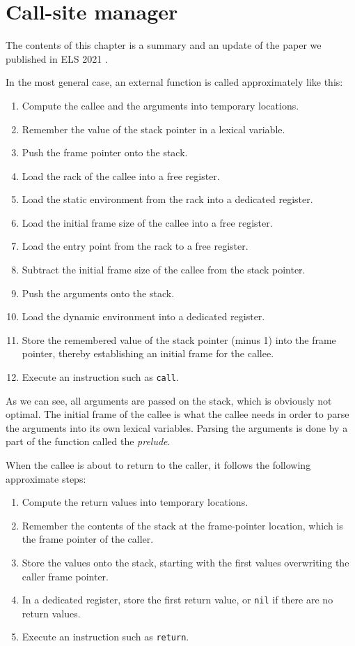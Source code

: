\chapter{Call-site manager}
\label{chap-call-site-manager}

The contents of this chapter is a summary and an update of the paper
we published in ELS 2021 \cite{DBLP:conf/els/Strandh21}.

In the most general case, an external function is called approximately
like this:
\begin{enumerate}
\item Compute the callee and the arguments into temporary locations.
\item Remember the value of the stack pointer in a lexical variable.
\item Push the frame pointer onto the stack.
\item Load the rack of the callee into a free register.
\item Load the static environment from the rack into a dedicated
  register.
\item Load the initial frame size of the callee into a free register.
\item Load the entry point from the rack to a free register.
\item Subtract the initial frame size of the callee from the stack
  pointer.
\item Push the arguments onto the stack.
\item Load the dynamic environment into a dedicated register.
\item Store the remembered value of the stack pointer (minus 1) into
  the frame pointer, thereby establishing an initial frame for the
  callee.
\item Execute an instruction such as \texttt{call}.
\end{enumerate}

As we can see, all arguments are passed on the stack, which is
obviously not optimal.  The initial frame of the callee is what the
callee needs in order to parse the arguments into its own lexical
variables.  Parsing the arguments is done by a part of the function
called the \emph{prelude}.

When the callee is about to return to the caller, it follows the
following approximate steps:

\begin{enumerate}
\item Compute the return values into temporary locations.
\item Remember the contents of the stack at the frame-pointer
  location, which is the frame pointer of the caller.
\item Store the values onto the stack, starting with the first values
  overwriting the caller frame pointer.
\item In a dedicated register, store the first return value, or
  \texttt{nil} if there are no return values.
\item Execute an instruction such as \texttt{return}.
\end{enumerate}

